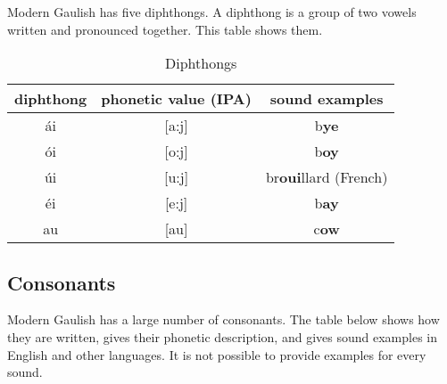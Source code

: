 Modern Gaulish has five diphthongs. A diphthong is a group of two vowels written and pronounced together. This table shows them.

\begin{table}[H]
\begin{center}
\begin{tabu}{c|c|c}
  \textbf{diphthong} & \textbf{phonetic value (IPA)} & \textbf{sound examples}\\
  \toprule
  \'{a}i & [a:j] & b\textbf{ye}\\
  \'{o}i & [o:j] & b\textbf{oy}\\
  \'{u}i & [u:j] & br\textbf{oui}llard (French)\\
  \'{e}i & [e:j] & b\textbf{ay}\\
  au & [au] & c\textbf{ow}\\
\end{tabu}
\end{center}
\caption{Diphthongs}
\label{phonology_diphthongs}
\end{table}

\subsection{Consonants}

Modern Gaulish has a large number of consonants. The table below shows how they are written, gives their phonetic description, and gives sound examples in English and other languages. It is not possible to provide examples for every sound.

